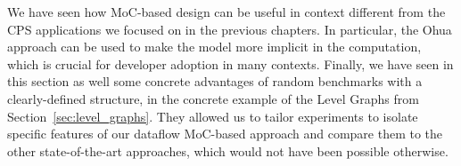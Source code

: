 We have seen how \ac{MoC}-based design can be useful in context different from the \ac{CPS} applications we focused on in the previous chapters.
In particular, the Ohua approach can be used to make the model more implicit in the computation, which is crucial for developer adoption in many contexts.
Finally, we have seen in this section as well some concrete advantages of random benchmarks with a clearly-defined structure, in the concrete example of the Level Graphs from Section~\ref{sec:level_graphs}.
They allowed us to tailor experiments to isolate specific features of our dataflow \ac{MoC}-based approach and compare them to the other state-of-the-art approaches, which would not have been possible otherwise.
